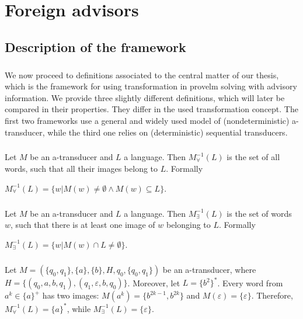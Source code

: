 \chapter{Foreign advisors}
\label{chap:advisors}

\section{Description of the framework}
\paragraph{}
We now proceed to definitions associated to the central matter of our thesis, which is the framework for using transformation in provelm solving with advisory information. We provide three slightly different definitions, which will later be compared in their properties. They differ in the used transformation concept. The first two frameworks use a general and widely used model of (nondeterministic) a-transducer, while the third one relies on (deterministic) sequential transducers.

\paragraph{}
\cdefinicia Let $M$ be an a-transducer and $L$ a language. Then $M_{\forall}^{-1}(L)$ is the set of all words, such that all their images belong to $L$. Formally \\
\centerline{$M_{\forall}^{-1}(L) = \{ w | M(w) \neq \emptyset \wedge M(w) \subseteq L \}$.}

\paragraph{}
\cdefinicia Let $M$ be an a-transducer and $L$ a language. Then $M_{\exists}^{-1}(L)$ is the set of words $w$, such that there is at least one image of $w$ belonging to $L$. Formally \\
\centerline{$M_{\exists}^{-1}(L) = \{ w | M(w) \cap L \neq \emptyset\}$.}


\paragraph{}
\cpriklad Let $M = (\{q_0,q_1\}, \{a\},\{b\},H,q_0,\{q_0,q_1\})$ be an a-transducer, where $H = \{(q_0,a,b,q_1),(q_1,\varepsilon,b,q_0)\}$. Moreover, let $L = \{b^2\}^*$. Every word from $a^k \in \{a\}^+$ has two images: $M(a^k) = \{b^{2k-1},b^{2k}\}$ and $M(\varepsilon) = \{\varepsilon\}$. Therefore, $M_{\forall}^{-1}(L) = \{a\}^*$,  while $M_{\exists}^{-1}(L) = \{\varepsilon\}$. 

